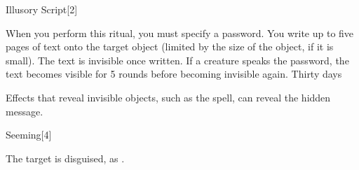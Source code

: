 \begin{spellsection}{Illusory Script}[2]
    \begin{spellheader}
    \end{spellheader}
    \begin{spellcontent}
        \begin{spelltargetinginfo}
        \end{spelltargetinginfo}
        \begin{spelleffects}
            \spellspecial When you perform this ritual, you must specify a password.
            \spelleffect You write up to five pages of text onto the target object (limited by the size of the object, if it is small).
            The text is invisible once written.
            If a creature speaks the password, the text becomes visible for 5 rounds before becoming invisible again.
            \spelldur Thirty days
        \end{spelleffects}
    \end{spellcontent}
    \begin{spellfooter}
        \spellnotes Effects that reveal invisible objects, such as the  spell, can reveal the hidden message.
    \end{spellfooter}
    \begin{spellaugments}
    \end{spellaugments}
\end{spellsection}

\begin{spellsection}{Seeming}[4]
    \begin{spellheader}
    \end{spellheader}
    \begin{spellcontent}
        \begin{spelltargetinginfo}
        \end{spelltargetinginfo}
        \begin{spelleffects}
            \spelleffect The target is disguised, as .
            \spelldur \durlong \dismissable
        \end{spelleffects}
    \end{spellcontent}
    \begin{spellfooter}
    \end{spellfooter}
\end{spellsection}

